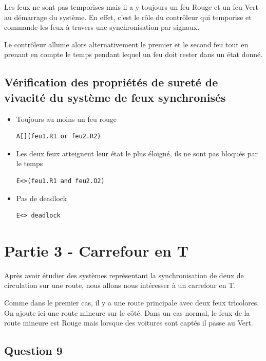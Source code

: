 \documentclass[11pt]{article}
\begin{document}
Les feux ne sont pas temporises mais il a y toujours un feu Rouge et un feu Vert au démarrage du système. En effet, c'est le rôle du contrôleur qui temporise et commande les feux à travers une synchronisation par signaux. 

Le contrôleur allume alors alternativement le premier et le second feu tout en prenant en compte le temps pendant lequel un feu doit rester dans un état donné.

\subsection*{Vérification des propriétés de sureté de vivacité du système de feux synchronisés}

\begin{itemize}
	\item Toujours au moins un feu rouge
\begin{verbatim}
A[](feu1.R1 or feu2.R2)
\end{verbatim}

	\item Les deux feux atteignent leur état le plus éloigné, ils ne sont pas bloqués par le temps
\begin{verbatim}
E<>(feu1.R1 and feu2.O2)
\end{verbatim}

	\item Pas de deadlock
\begin{verbatim}
E<> deadlock
\end{verbatim}

\end{itemize}

\section{Partie 3 - Carrefour en T}
Après avoir étudier des systèmes représentant la synchronisation de deux de circulation sur une route, nous allons nous intéresser à un carrefour en T.

Comme dans le premier cas, il y a une route principale avec deux feux tricolores. On ajoute ici une route mineure sur le côté. Dans un cas normal, le feux de la route mineure est Rouge mais lorsque des voitures sont captés il passe au Vert.

\subsection{Question 9}
\end{document}
